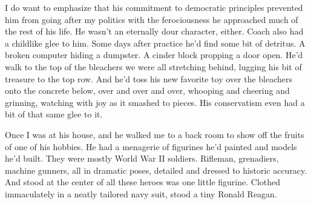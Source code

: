 \documentclass[12pt, oneside]{memoir}
\begin{document}
I do want to emphasize that his
commitment to democratic principles prevented him from going after my
politics with the ferociousness he approached much of the rest of his
life.
He wasn't an eternally dour character, either.
Coach also had a childlike glee to him.
Some days after practice he'd find some bit of detritus.
A broken computer hiding a dumpster.
A cinder block propping a door open.
He'd walk to the top of the bleachers we were all stretching behind,
lugging his bit of treasure to the top row.
And he'd toss his new favorite toy over the bleachers onto the
concrete below, over and over and over, whooping and cheering and
grinning, watching with joy as it smashed to pieces.
His conservatism even had a bit of that same glee to it.

Once I was at his house, and he walked me to a back room to show off
the fruits of one of his hobbies.
He had a menagerie of figurines he'd painted and models he'd built.
They were mostly World War II soldiers.
Rifleman, grenadiers, machine gunners, all in dramatic poses, detailed
and dressed to historic accuracy.
And stood at the center of all these heroes was one little figurine.
Clothed immaculately in a neatly tailored navy suit, stood a
tiny Ronald Reagan.



\end{document}
